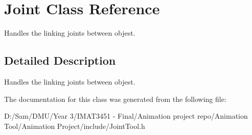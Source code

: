 \hypertarget{class_joint}{}\section{Joint Class Reference}
\label{class_joint}


Handles the linking joints between objest.  




\subsection{Detailed Description}
Handles the linking joints between objest. 

The documentation for this class was generated from the following file\+:\begin{DoxyCompactItemize}
\item 
D\+:/\+Sam/\+D\+M\+U/\+Year 3/\+I\+M\+A\+T3451 -\/ Final/\+Animation project repo/\+Animation Tool/\+Animation Project/include/Joint\+Tool.\+h\end{DoxyCompactItemize}
